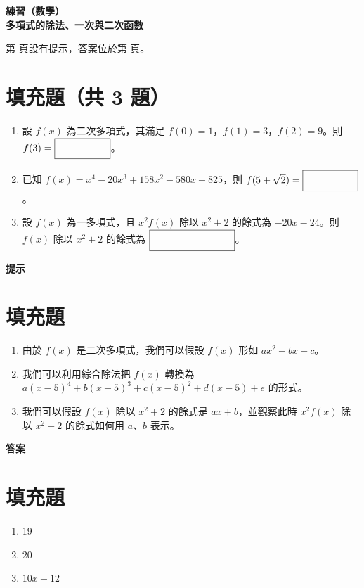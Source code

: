 \documentclass[10pt]{article}
\newcommand*{\blank}[1]{\rule[-.7\baselineskip]{0pt}{1.8\baselineskip}\fbox{\rule[-.4\baselineskip]{0pt}{1.2\baselineskip}\hspace{#1}}}
\renewcommand*{\maketitle}{{%
  \bfseries
  \LARGE 練習（數學） \\
  \large 多項式的除法、一次與二次函數 \par
}}
\begin{document}
\maketitle
\medskip
第 \pageref{hint} 頁設有提示，答案位於第 \pageref{answer} 頁。
\section{填充題（共 3 題）}
\begin{enumerate}[label=\Alph*.,align=left,leftmargin=*,labelsep=.3em]
  \item 設 $f(x)$ 為二次多項式，其滿足 $f(0) = 1$，$f(1) = 3$，$f(2) = 9$。則 $f(3) = \blank{5em}$。
  \newpage
  \item 已知 $f(x) = x^4 - 20x^3 + 158x^2 - 580x + 825$，則 $f(5 + \sqrt{2}) = \blank{5em}$。
  \newpage
  \item 設 $f(x)$ 為一多項式，且 $x^2f(x)$ 除以 $x^2 + 2$ 的餘式為 $-20x - 24$。則 $f(x)$ 除以 $x^2 + 2$ 的餘式為 $\blank{8em}$。
\end{enumerate}

\newpage
\label{hint}
{\bfseries\large 提示 \par}
\setcounter{section}{0}
\section{填充題}
\begin{enumerate}[label=\Alph*.,left=0pt]
  \item 由於 $f(x)$ 是二次多項式，我們可以假設 $f(x)$ 形如 $ax^2 + bx + c$。
  \item 我們可以利用綜合除法把 $f(x)$ 轉換為 $a(x-5)^4 + b(x-5)^3 + c(x-5)^2 + d(x-5) + e$ 的形式。
  \item 我們可以假設 $f(x)$ 除以 $x^2 + 2$ 的餘式是 $ax + b$，並觀察此時 $x^2f(x)$ 除以 $x^2 + 2$ 的餘式如何用 $a$、$b$ 表示。
\end{enumerate}

\newpage
\label{answer}
{\bfseries\large 答案 \par}
\setcounter{section}{0}
\section{填充題}
\begin{enumerate}[label=\Alph*.,left=0pt]
  \item 19
  \item 20
  \item $10x + 12$
\end{enumerate}
\end{document}
